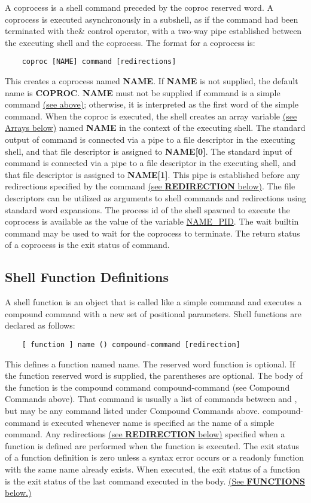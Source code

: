 A coprocess is a shell command preceded by the coproc reserved word. A coprocess is executed asynchronously in a subshell, as if the command had been terminated with the\& control operator, with a two-way pipe established between the executing shell and the coprocess.
The format for a coprocess is:
\begin{lstlisting}
    coproc [NAME] command [redirections]
\end{lstlisting}

This creates a coprocess named \textbf{NAME}. If \textbf{NAME} is not supplied, the default name is \textbf{COPROC}. \textbf{NAME} must not be supplied if command is a simple command \hyperref[lst:if]{(see above)}; otherwise, it is interpreted as the first word of the simple command. When the coproc is executed, the shell creates an array variable \hyperref[sec:arrays]{(see Arrays below)} named \textbf{NAME} in the context of the executing shell. The standard output of command is connected via a pipe to a file descriptor in the executing shell, and that file descriptor is assigned to \textbf{NAME[0]}. The standard input of command is connected via a pipe to a file descriptor in the executing shell, and that file descriptor is assigned to \textbf{NAME[1]}. This pipe is established before any redirections specified by the command \hyperref[sec:redirection]{(see \textbf{REDIRECTION} below)}. The file descriptors can be utilized as arguments to shell commands and redirections using standard word expansions. The process id of the shell spawned to execute the coprocess is available as the value of the variable \url{NAME\_PID}. The wait builtin command may be used to wait for the coprocess to terminate.
The return status of a coprocess is the exit status of command.

\subsection{Shell Function Definitions}

A shell function is an object that is called like a simple command and executes a compound command with a new set of positional parameters. Shell functions are declared as follows:
\begin{lstlisting}
    [ function ] name () compound-command [redirection]
\end{lstlisting}

This defines a function named name. The reserved word function is optional. If the function reserved word is supplied, the parentheses are optional. The body of the function is the compound command compound-command (see Compound Commands above). That command is usually a list of commands between { and }, but may be any command listed under Compound Commands above. compound-command is executed whenever name is specified as the name of a simple command. Any redirections \hyperref[sec:redirection]{(see \textbf{REDIRECTION} below)} specified when a function is defined are performed when the function is executed. The exit status of a function definition is zero unless a syntax error occurs or a readonly function with the same name already exists. When executed, the exit status of a function is the exit status of the last command executed in the body. \hyperref[sec:functions]{(See \textbf{FUNCTIONS} below.)}